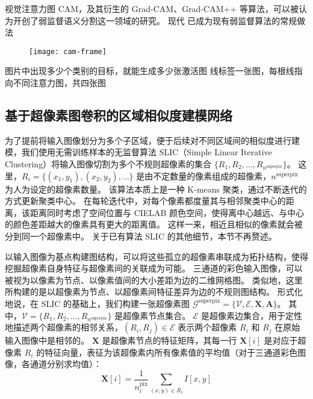 \par
视觉注意力图 CAM，及其衍生的 Grad-CAM、Grad-CAM++ 等算法，可以被认为开创了弱监督语义分割这一领域的研究。
现代
已成为现有弱监督算法的常规做法
\par
\begin{figure}[h]
\centering
\texttt{[image: cam-frame]}
\caption{}
\label{fig:cam-frame}
\end{figure}
\par
图片中出现多少个类别的目标，就能生成多少张激活图
线标签一张图，每根线指向不同注意力图，共四张图
\subsection{基于超像素图卷积的区域相似度建模网络}
\label{subsec:affinity}
为了提前将输入图像划分为多个子区域，便于后续对不同区域间的相似度进行建模，我们使用无需训练样本的无监督算法 SLIC（Simple Linear Iterative Clustering）将输入图像切割为多个不规则超像素的集合 $\{ R_1, R_2, \dots, R_{n^\text{superpix}} \}$。
这里，$R_i = \{ (x_1,y_1), (x_2,y_2), \dots \}$ 是由不定数量的像素组成的超像素，$n^\text{superpix}$ 为人为设定的超像素数量\cite{}。
该算法本质上是一种 K-means 聚类\cite{}，通过不断迭代的方式更新聚类中心。
在每轮迭代中，对每个像素都度量其与相邻聚类中心的距离，该距离同时考虑了空间位置与 CIELAB 颜色空间，使得离中心越远、与中心的颜色差距越大的像素具有更大的距离值。
这样一来，相近且相似的像素就会被分到同一个超像素中。
关于已有算法 SLIC 的其他细节，本节不再赘述。
\par
以输入图像为基点构建图结构，可以将这些孤立的超像素串联成为拓扑结构，使得挖掘超像素自身特征与超像素间的关联成为可能。
三通道的彩色输入图像，可以被视为以像素为节点、以像素值间的大小差距为边的二维网格图。
类似地，这里所构建的是以超像素为节点、以超像素间特征差异为边的不规则图结构。
形式化地说，在 SLIC 的基础上，我们构建一张超像素图 $\mathcal{G}^\text{superpix} = \{ \mathcal{V}, \mathcal{E}, \mathbf{X}, \mathbf{A} \}$。
其中，$\mathcal{V} = \{ R_1, R_2, \dots, R_{n^\text{superpix}} \}$ 是超像素节点集合。
$\mathcal{E}$ 是超像素边集合，用于定性地描述两个超像素的相邻关系，$(R_i, R_j) \in \mathcal{E}$ 表示两个超像素 $R_i$ 和 $R_j$ 在原始输入图像中是相邻的。
$\mathbf{X}$ 是超像素节点的特征矩阵，其每一行 $\mathbf{X}[i]$ 是对应于超像素 $R_i$ 的特征向量，表征为该超像素内所有像素值的平均值（对于三通道彩色图像，各通道分别求均值）：
\begin{equation}
\mathbf{X}[i] = \frac{1}{n^\text{pix}_i} \sum_{(x,y) \in R_i} I[x,y] 
\end{equation}
